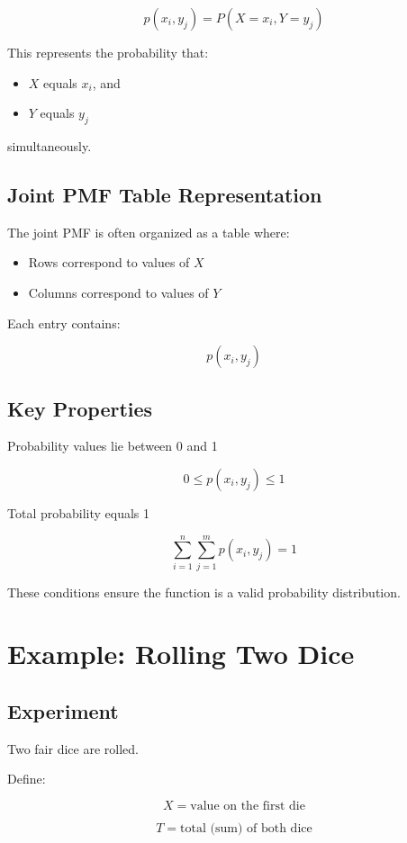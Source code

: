 \documentclass[12pt]{article}
\begin{document}
\[
p(x_i,y_j) = P(X=x_i,Y=y_j)
\]

This represents the probability that:

\begin{itemize}
\item $X$ equals $x_i$, and
\item $Y$ equals $y_j$
\end{itemize}

simultaneously.

\subsection*{Joint PMF Table Representation}

The joint PMF is often organized as a table where:

\begin{itemize}
\item Rows correspond to values of $X$
\item Columns correspond to values of $Y$
\end{itemize}

Each entry contains:

\[
p(x_i,y_j)
\]

\subsection*{Key Properties}

Probability values lie between 0 and 1

\[
0 \le p(x_i,y_j) \le 1
\]

Total probability equals 1

\[
\sum_{i=1}^{n} \sum_{j=1}^{m} p(x_i,y_j) = 1
\]

These conditions ensure the function is a valid probability distribution.

\section{Example: Rolling Two Dice}

\subsection*{Experiment}

Two fair dice are rolled.

Define:

\[
X = \text{value on the first die}
\]

\[
T = \text{total (sum) of both dice}
\]
\end{document}
